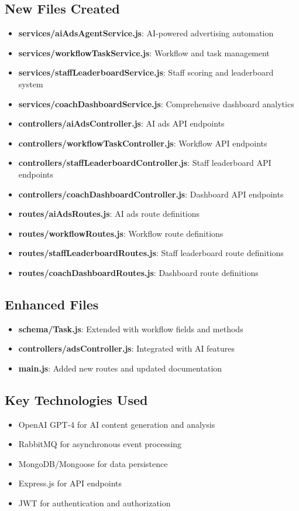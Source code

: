 \documentclass[12pt,a4paper]{article}
\begin{document}
\subsection{New Files Created}
\begin{itemize}
    \item \textbf{services/aiAdsAgentService.js}: AI-powered advertising automation
    \item \textbf{services/workflowTaskService.js}: Workflow and task management
    \item \textbf{services/staffLeaderboardService.js}: Staff scoring and leaderboard system
    \item \textbf{services/coachDashboardService.js}: Comprehensive dashboard analytics
    \item \textbf{controllers/aiAdsController.js}: AI ads API endpoints
    \item \textbf{controllers/workflowTaskController.js}: Workflow API endpoints
    \item \textbf{controllers/staffLeaderboardController.js}: Staff leaderboard API endpoints
    \item \textbf{controllers/coachDashboardController.js}: Dashboard API endpoints
    \item \textbf{routes/aiAdsRoutes.js}: AI ads route definitions
    \item \textbf{routes/workflowRoutes.js}: Workflow route definitions
    \item \textbf{routes/staffLeaderboardRoutes.js}: Staff leaderboard route definitions
    \item \textbf{routes/coachDashboardRoutes.js}: Dashboard route definitions
\end{itemize}

\subsection{Enhanced Files}
\begin{itemize}
    \item \textbf{schema/Task.js}: Extended with workflow fields and methods
    \item \textbf{controllers/adsController.js}: Integrated with AI features
    \item \textbf{main.js}: Added new routes and updated documentation
\end{itemize}

\subsection{Key Technologies Used}
\begin{itemize}
    \item OpenAI GPT-4 for AI content generation and analysis
    \item RabbitMQ for asynchronous event processing
    \item MongoDB/Mongoose for data persistence
    \item Express.js for API endpoints
    \item JWT for authentication and authorization
\end{itemize}
\end{document}
